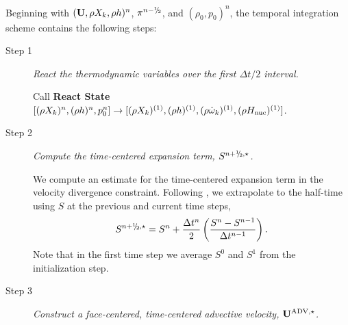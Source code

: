\documentclass{aastex62}
\newcommand{\sfrac}[2]{\mathchoice
  {\kern0em\raise.5ex\hbox{\the\scriptfont0 #1}\kern-.15em/
   \kern-.15em\lower.25ex\hbox{\the\scriptfont0 #2}}
  {\kern0em\raise.5ex\hbox{\the\scriptfont0 #1}\kern-.15em/
   \kern-.15em\lower.25ex\hbox{\the\scriptfont0 #2}}
  {\kern0em\raise.5ex\hbox{\the\scriptscriptfont0 #1}\kern-.2em/
   \kern-.15em\lower.25ex\hbox{\the\scriptscriptfont0 #2}}
  {#1\!/#2}}
\newcommand{\myhalf}{\sfrac{1}{2}}
\newcommand{\Ub}{{\bf{U}}}
\newcommand{\dt}{\Delta t}
\newcommand{\Hnuc}{H_{\rm nuc}}
\newcommand{\omegadot}{\dot\omega}
\newcommand{\nph}{{n+\myhalf}}
\newcommand{\uadvone}{\Ub^{\mathrm{ADV},\star}}
\begin{document}
Beginning with $(\Ub,\rho X_k,\rho h)^n$, $\pi^{n-\myhalf}$, and $(\rho_0,p_0)^n$,
the temporal integration scheme contains the following steps:
\begin{description}

\item[Step 1] {\em React the thermodynamic variables over the first $\Delta t / 2$ interval.}

Call {\bf React State}$[(\rho X_k)^n, (\rho h)^n, p_0^n] \rightarrow [(\rho X_k)^{(1)}, (\rho h)^{(1)}, (\rho \omegadot_k)^{(1)}, (\rho \Hnuc)^{(1)}]$.


\item[Step 2] {\em Compute the time-centered expansion term, $S^{\nph,\star}$.}

We compute an estimate for the time-centered expansion term in the velocity
divergence constraint.  Following \citet{Bell:2004}, we extrapolate
to the half-time using $S$ at the previous and current
time steps,
\begin{equation}
S^{\nph,\star} = S^n + \frac{\dt^n}{2} \left(\frac{S^n - S^{n-1}}{\dt^{n-1}}\right).
\end{equation}
Note that in the first time step we average $S^0$ and $S^1$ from the
initialization step.

\item[Step 3] {\em Construct a face-centered, time-centered advective velocity, $\uadvone$.}


\end{description}
\end{document}
